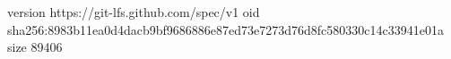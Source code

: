 version https://git-lfs.github.com/spec/v1
oid sha256:8983b11ea0d4dacb9bf9686886e87ed73e7273d76d8fc580330c14c33941e01a
size 89406
